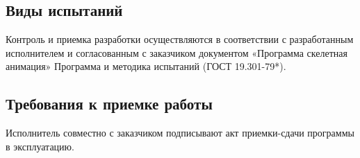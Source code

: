 \subsection{Виды испытаний}
Контроль и приемка разработки осуществляются в соответствии с разработанным исполнителем и согласованным с заказчиком документом «Программа скелетная анимация»
Программа и методика испытаний (ГОСТ 19.301-79*).

\subsection{Требования к приемке работы}
Исполнитель совместно с заказчиком подписывают акт приемки-сдачи программы в эксплуатацию.